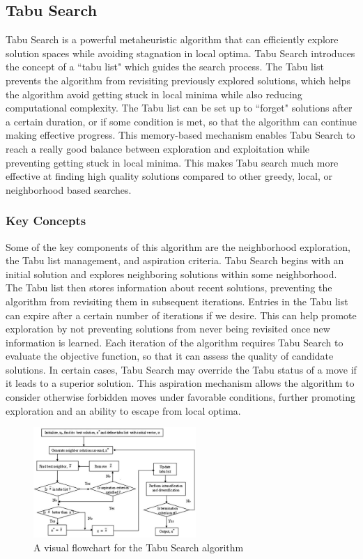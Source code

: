 \documentclass{article}
\begin{document}
\subsection{Tabu Search}
Tabu Search is a powerful metaheuristic algorithm that can efficiently explore solution spaces while avoiding stagnation in local optima. Tabu Search introduces the concept of a ``tabu list" which guides the search process. The Tabu list prevents the algorithm from revisiting previously explored solutions, which helps the algorithm avoid getting stuck in local minima while also reducing computational complexity. The Tabu list can be set up to ``forget" solutions after a certain duration, or if some condition is met, so that the algorithm can continue making effective progress. This memory-based mechanism enables Tabu Search to reach a really good balance between exploration and exploitation while preventing getting stuck in local minima. This makes Tabu search much more effective at finding high quality solutions compared to other greedy, local, or neighborhood based searches.

\subsubsection{Key Concepts}
Some of the key components of this algorithm are the neighborhood exploration, the Tabu list management, and aspiration criteria. Tabu Search begins with an initial solution and explores neighboring solutions within some neighborhood. The Tabu list then stores information about recent solutions, preventing the algorithm from revisiting them in subsequent iterations. Entries in the Tabu list can expire after a certain number of iterations if we desire. This can help promote exploration by not preventing solutions from never being revisited once new information is learned. Each iteration of the algorithm requires Tabu Search to evaluate the objective function, so that it can assess the quality of candidate solutions. In certain cases, Tabu Search may override the Tabu status of a move if it leads to a superior solution. This aspiration mechanism allows the algorithm to consider otherwise forbidden moves under favorable conditions, further promoting exploration and an ability to escape from local optima.
\begin{figure}[h]
    \centering
    \includegraphics[width=0.55\textwidth,keepaspectratio]{Images/tabu.png}
    \caption{A visual flowchart for the Tabu Search algorithm}
    \label{fig:algsOverTime}
\end{figure}
\end{document}

